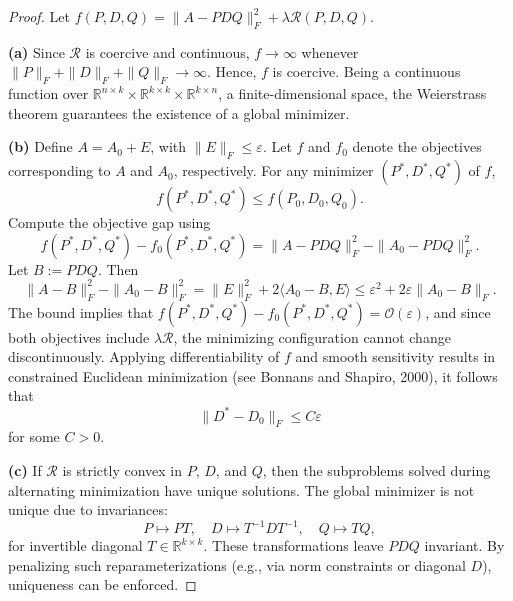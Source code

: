 \documentclass[10pt,a4paper]{article}
\begin{document}
\begin{proof}
Let \( f(P, D, Q) = \| A - P D Q \|_F^2 + \lambda \mathcal{R}(P, D, Q) \).

\textbf{(a)} Since \( \mathcal{R} \) is coercive and continuous, \( f \to \infty \) whenever \( \|P\|_F + \|D\|_F + \|Q\|_F \to \infty \). Hence, \( f \) is coercive. Being a continuous function over \( \mathbb{R}^{n \times k} \times \mathbb{R}^{k \times k} \times \mathbb{R}^{k \times n} \), a finite-dimensional space, the Weierstrass theorem guarantees the existence of a global minimizer.

\textbf{(b)} Define \( A = A_0 + E \), with \( \|E\|_F \leq \varepsilon \). Let \( f \) and \( f_0 \) denote the objectives corresponding to \( A \) and \( A_0 \), respectively. For any minimizer \( (P^*, D^*, Q^*) \) of \( f \),
\[
f(P^*, D^*, Q^*) \leq f(P_0, D_0, Q_0).
\]
Compute the objective gap using
\[
f(P^*, D^*, Q^*) - f_0(P^*, D^*, Q^*) = \|A - P D Q\|_F^2 - \|A_0 - P D Q\|_F^2.
\]
Let \( B := P D Q \). Then
\[
\|A - B\|_F^2 - \|A_0 - B\|_F^2 = \|E\|_F^2 + 2 \langle A_0 - B, E \rangle \leq \varepsilon^2 + 2 \varepsilon \|A_0 - B\|_F.
\]
The bound implies that \( f(P^*, D^*, Q^*) - f_0(P^*, D^*, Q^*) = \mathcal{O}(\varepsilon) \), and since both objectives include \( \lambda \mathcal{R} \), the minimizing configuration cannot change discontinuously. Applying differentiability of \( f \) and smooth sensitivity results in constrained Euclidean minimization (see Bonnans and Shapiro, 2000), it follows that
\[
\| D^* - D_0 \|_F \leq C \varepsilon
\]
for some \( C > 0 \).

\textbf{(c)} If \( \mathcal{R} \) is strictly convex in \( P \), \( D \), and \( Q \), then the subproblems solved during alternating minimization have unique solutions. The global minimizer is not unique due to invariances:
\[
P \mapsto PT, \quad D \mapsto T^{-1} D T^{-1}, \quad Q \mapsto T Q,
\]
for invertible diagonal \( T \in \mathbb{R}^{k \times k} \). These transformations leave \( P D Q \) invariant. By penalizing such reparameterizations (e.g., via norm constraints or diagonal \( D \)), uniqueness can be enforced.


\end{proof}
\end{document}
